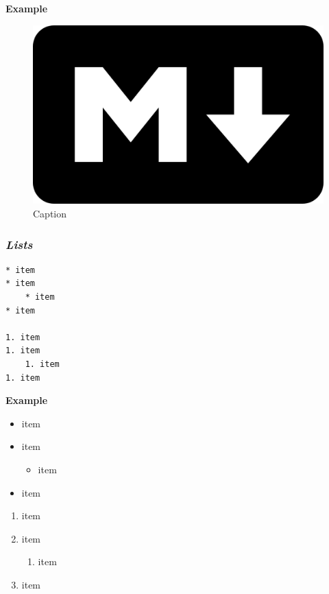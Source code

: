 \documentclass[journal,10pt,final]{IEEEtran}
\providecommand{\tightlist}{%
  \setlength{\itemsep}{0pt}\setlength{\parskip}{0pt}}
\begin{document}
\textbf{Example}

\begin{figure}[htbp]
\centering
\includegraphics{../images/markdown.png}
\caption{Caption}
\end{figure}

\subsubsection{\texorpdfstring{\textbf{\emph{Lists}}}{Lists}}\label{lists}

\begin{verbatim}
* item
* item
    * item
* item

1. item
1. item
    1. item
1. item
\end{verbatim}

\textbf{Example}

\begin{itemize}
\tightlist
\item
  item
\item
  item

  \begin{itemize}
  \tightlist
  \item
    item
  \end{itemize}
\item
  item
\end{itemize}

\begin{enumerate}
\def\labelenumi{\arabic{enumi}.}
\tightlist
\item
  item
\item
  item

  \begin{enumerate}
  \def\labelenumii{\arabic{enumii}.}
  \tightlist
  \item
    item
  \end{enumerate}
\item
  item
\end{enumerate}
\end{document}
